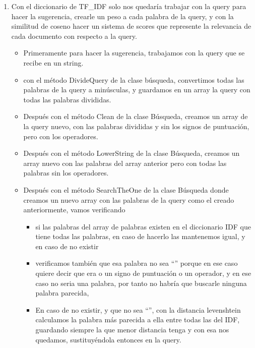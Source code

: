 \documentclass[12pt, a4paper]{article}
\begin{document}
\begin{enumerate}
      \item Con el diccionario de TF\_IDF solo nos quedaría trabajar con la query para hacer la
            sugerencia, crearle un peso a cada palabra de la query, y con la similitud de
            coseno hacer un sistema de scores que represente la relevancia de
            cada documento con respecto a la query.
            \begin{itemize}
                  \item  Primeramente para hacer la sugerencia, trabajamos con la query que
                        se recibe en un string.
                  \item con el método DivideQuery de la clase búsqueda,
                        convertimos todas las palabras de la query a minúsculas, y guardamos en un array
                        la query con todas las palabras divididas.
                  \item Después con el método Clean de la clase Búsqueda,
                        creamos un array de la query nuevo, con las palabras divididas y
                        sin los signos de puntuación, pero con los operadores.
                  \item Después con el método LowerString de la clase Búsqueda,
                        creamos un array nuevo con las palabras del array anterior pero
                        con todas las palabras sin los operadores.
                  \item Después con el método SearchTheOne de la clase Búsqueda
                        donde creamos un nuevo array con las palabras de la query
                        como el creado anteriormente, vamos verificando

                        \begin{itemize}
                              \item si las palabras del array de palabras existen en el diccionario IDF
                                    que tiene todas las palabras, en caso de hacerlo las mantenemos igual,
                                    y en caso de no existir
                              \item verificamos también que esa palabra no sea “”
                                    porque en ese caso quiere decir que era o un signo de puntuación o un operador,
                                    y en ese caso no seria una palabra, por tanto no habría que buscarle
                                    ninguna palabra parecida,
                              \item En caso de no existir, y que no sea “”,
                                    con la distancia levenshtein calculamos la palabra más parecida a ella entre todas
                                    las del IDF, guardando siempre la que menor distancia tenga y con esa
                                    nos quedamos, sustituyéndola entonces en la query.



\end{itemize}
\end{itemize}
\end{enumerate}
\end{document}
